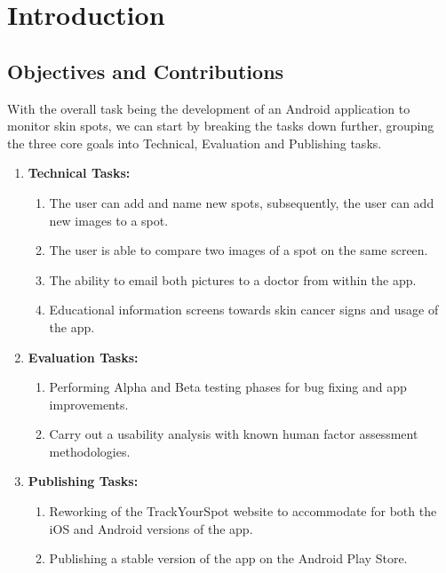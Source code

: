 \chapter{Introduction}

\section{Objectives and Contributions}
With the overall task being the development of an Android application to monitor skin spots, we can start by breaking the tasks down further, grouping the three core goals into Technical, Evaluation and Publishing tasks.
\begin{enumerate}
    \item \textbf{Technical Tasks:}
    \begin{enumerate}
        \item The user can add and name new spots, subsequently, the user can add new images to a spot.
        \item The user is able to compare two images of a spot on the same screen.
        \item The ability to email both pictures to a doctor from within the app.
        \item Educational information screens towards skin cancer signs and usage of the app.
    \end{enumerate}
    \item \textbf{Evaluation Tasks:}
    \begin{enumerate}
        \item Performing Alpha and Beta testing phases for bug fixing and app improvements.
        \item Carry out a usability analysis with known human factor assessment methodologies.
    \end{enumerate}
    \item \textbf{Publishing Tasks:}
    \begin{enumerate}
        \item Reworking of the TrackYourSpot website to accommodate for both the iOS and Android versions of the app.
        \item Publishing a stable version of the app on the Android Play Store.
    \end{enumerate}
\end{enumerate}

